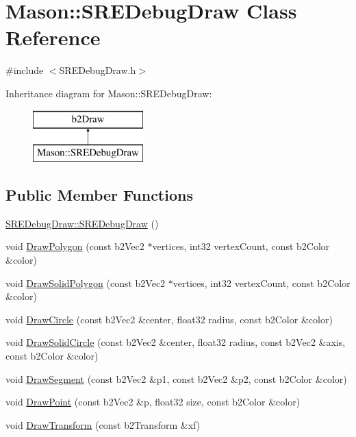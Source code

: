 \hypertarget{class_mason_1_1_s_r_e_debug_draw}{}\section{Mason\+:\+:S\+R\+E\+Debug\+Draw Class Reference}
\label{class_mason_1_1_s_r_e_debug_draw}


{\ttfamily \#include $<$S\+R\+E\+Debug\+Draw.\+h$>$}

Inheritance diagram for Mason\+:\+:S\+R\+E\+Debug\+Draw\+:\begin{figure}[H]
\begin{center}
\leavevmode
\includegraphics[height=2.000000cm]{class_mason_1_1_s_r_e_debug_draw}
\end{center}
\end{figure}
\subsection*{Public Member Functions}
\begin{DoxyCompactItemize}
\item 
\hyperlink{class_mason_1_1_s_r_e_debug_draw_ac95adf7a5ca2538a69cca69e694dbc58}{S\+R\+E\+Debug\+Draw\+::\+S\+R\+E\+Debug\+Draw} ()
\item 
void \hyperlink{class_mason_1_1_s_r_e_debug_draw_a3aeb14dc08bb5c4d490e30cc62ad1787}{Draw\+Polygon} (const b2\+Vec2 $\ast$vertices, int32 vertex\+Count, const b2\+Color \&color)
\item 
void \hyperlink{class_mason_1_1_s_r_e_debug_draw_af8308d695e1c6b61a2ba4226921c6b70}{Draw\+Solid\+Polygon} (const b2\+Vec2 $\ast$vertices, int32 vertex\+Count, const b2\+Color \&color)
\item 
void \hyperlink{class_mason_1_1_s_r_e_debug_draw_a6cb71e10d252900e6f469389146b9f48}{Draw\+Circle} (const b2\+Vec2 \&center, float32 radius, const b2\+Color \&color)
\item 
void \hyperlink{class_mason_1_1_s_r_e_debug_draw_a9392357bb882d28ca0a86f179901488b}{Draw\+Solid\+Circle} (const b2\+Vec2 \&center, float32 radius, const b2\+Vec2 \&axis, const b2\+Color \&color)
\item 
void \hyperlink{class_mason_1_1_s_r_e_debug_draw_ae52016e6134930d09f6f8a07308cc9e7}{Draw\+Segment} (const b2\+Vec2 \&p1, const b2\+Vec2 \&p2, const b2\+Color \&color)
\item 
void \hyperlink{class_mason_1_1_s_r_e_debug_draw_aaa826d0f196accca390c47023d28e2ce}{Draw\+Point} (const b2\+Vec2 \&p, float32 size, const b2\+Color \&color)
\item 
void \hyperlink{class_mason_1_1_s_r_e_debug_draw_a5255695e40bf3418a9f68e1405822aeb}{Draw\+Transform} (const b2\+Transform \&xf)
\end{DoxyCompactItemize}



